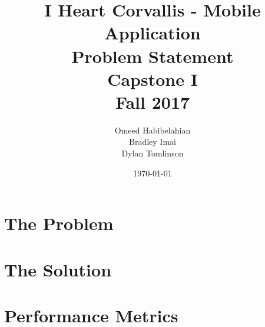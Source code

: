 \documentclass[draftclsnofoot, onecolumn, 10pt, compsoc]{IEEEtran}
\title{\textbf{I Heart Corvallis - Mobile Application\\Problem Statement}\\Capstone I\\Fall 2017}
\author{Omeed Habibelahian\\Bradley Imai\\Dylan Tomlinson}
\date{\today}
\begin{document}
	\maketitle
	\begin{abstract}
	\end{abstract}
	\newpage
	
	\section{The Problem}
	
	\section{The Solution}
	
	\section{Performance Metrics}
	
\end{document}

